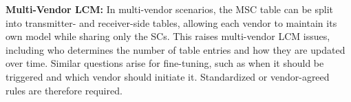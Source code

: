 \documentclass[10pt,twocolumn]{IEEEtran}
\begin{document}
\vspace{1mm}
{\bf Multi-Vendor LCM:} In multi-vendor scenarios, the MSC table can be split into transmitter- and receiver-side tables, allowing each vendor to maintain its own model while sharing only the SCs. This raises multi-vendor LCM issues, including who determines the number of table entries and how they are updated over time. Similar questions arise for fine-tuning, such as when it should be triggered and which vendor should initiate it. Standardized or vendor-agreed rules are therefore required.




\end{document}
